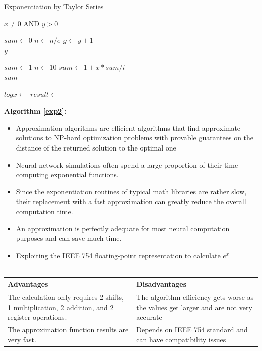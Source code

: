 \documentclass[11pt, english]{report}
\begin{document}
\begin{algorithm}
\caption{Exponentiation\cite{format} by Taylor Series}\label{exp1}
\begin{algorithmic}[1]
\Require $x \neq 0$ AND $y > 0$

\State $sum\gets 0$
    \State $n\gets n/e$
    \State $y \gets y+1 $
\EndWhile \\
\Return $y$
\EndFunction

\State $sum\gets 1$
\State $n\gets 10$
\State $sum\gets 1+ x * sum / i$
\EndFor \\
\Return $sum$
\EndFunction

\State $logx \gets $
\State $result \gets $
\end{algorithmic}
\end{algorithm}

\textbf{Algorithm \ref{exp2}:}
\begin{itemize}
    \item Approximation algorithms\cite{power} are efficient algorithms that find approximate solutions to NP-hard optimization problems with provable guarantees on the distance of the returned solution to the optimal one
    \item Neural network simulations often spend a large proportion of their time computing exponential functions. 
    \item Since the exponentiation routines of typical math libraries are rather slow, their replacement with a fast approximation can greatly reduce the overall computation time.
    \item An approximation is perfectly adequate for most neural computation purposes and can save much time.
    \item Exploiting the IEEE 754 floating-point representation to calculate $e^x$ \\ \\
\end{itemize}

\setlength{\tabcolsep}{18pt}
\renewcommand{\arraystretch}{1.5}
\begin{tabular}{ |p{6cm}|p{6cm}| }
\hline
\textbf{Advantages} & \textbf{Disadvantages}\\ \hline 
The calculation only requires 2 shifts, 1 multiplication, 2 addition, and 2 register operations.  & The algorithm efficiency gets worse as the values get larger and are not very accurate\\
\hline
The approximation function results are very fast. & Depends on IEEE 754 standard and can have compatibility issues\\
\hline

\end{tabular} \\ \\ \\ 
\end{document}
